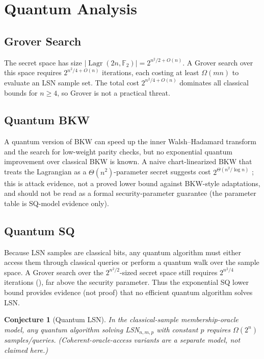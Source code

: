 \documentclass[11pt,a4paper]{article}
\theoremstyle{plain}
\newtheorem{conjecture}[theorem]{Conjecture}
\theoremstyle{definition}
\newcommand{\F}{\mathbb{F}}
\DeclareMathOperator{\Lagr}{Lagr}
\begin{document}
\section{Quantum Analysis}
\label{sec:quantum}

\subsection{Grover Search}
\label{subsec:grover}

The secret space has size $|\Lagr(2n,\F_2)| = 2^{n^2/2 + O(n)}$. A Grover search over this space requires $2^{n^2/4 + O(n)}$ iterations, each costing at least $\Omega(mn)$ to evaluate an LSN sample set. The total cost $2^{n^2/4 + O(n)}$ dominates all classical bounds for $n \geq 4$, so Grover is not a practical threat.

\subsection{Quantum BKW}
\label{subsec:qbkw}

A quantum version of BKW can speed up the inner Walsh--Hadamard transform and the search for low-weight parity checks, but no exponential quantum improvement over classical BKW is known. A naive chart-linearized BKW that treats the Lagrangian as a $\Theta(n^2)$-parameter secret suggests cost $2^{\Theta(n^2 / \log n)}$ \cite{BKW03}; this is attack evidence, not a proved lower bound against BKW-style adaptations, and should not be read as a formal security-parameter guarantee (the parameter table is SQ-model evidence only).

\subsection{Quantum SQ}
\label{subsec:quantum-sq}

Because LSN samples are classical bits, any quantum algorithm must either access them through classical queries or perform a quantum walk over the sample space. A Grover search over the $2^{n^2/2}$-sized secret space still requires $2^{n^2/4}$ iterations (), far above the security parameter. Thus the exponential SQ lower bound provides evidence (not proof) that no efficient quantum algorithm solves LSN.

\begin{conjecture}[Quantum LSN]
\label{conj:quantum}
In the classical-sample membership-oracle model, any quantum algorithm solving LSN$_{n,m,p}$ with constant $p$ requires $\Omega(2^n)$ samples/queries. (Coherent-oracle-access variants are a separate model, not claimed here.)
\end{conjecture}
\end{document}
